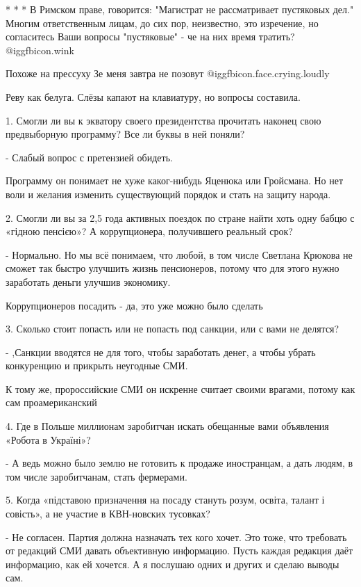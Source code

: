 \begin{itemize}
* * *
В Римском праве, говорится:
"Магистрат не рассматривает пустяковых дел."
Многим ответственным лицам, до сих пор, неизвестно, это изречение, но согласитесь Ваши вопросы "пустяковые" - че на них время тратить? @igg{fbicon.wink} 


Похоже на прессуху Зе меня завтра не позовут  @igg{fbicon.face.crying.loudly} 

Реву как белуга. Слёзы капают на клавиатуру, но вопросы составила.

1. Смогли ли вы к экватору своего президентства прочитать наконец свою
предвыборную программу? Все ли буквы в ней поняли?

- Слабый вопрос с претензией обидеть.

Программу он понимает не хуже каког-нибудь Яценюка или Гройсмана. Но нет воли и
желания изменить существующий порядок и стать на защиту народа.

2. Смогли ли вы за 2,5 года активных поездок по стране найти хоть одну бабцю с
«гідною пенсією»? А коррупционера, получившего реальный срок?

- Нормально. Но мы всё понимаем, что любой, в том числе Светлана Крюкова не
сможет так быстро улучшить жизнь пенсионеров, потому что для этого нужно
заработать деньги улучшив экономику.

Коррупционеров посадить - да, это уже можно было сделать

3. Сколько стоит попасть или не попасть под санкции, или с вами не делятся?

- ,Санкции вводятся не для того, чтобы заработать денег, а чтобы убрать
конкуренцию и прикрыть неугодные СМИ.

К тому же, пророссийские СМИ он искренне считает своими врагами, потому как сам
проамериканский

4. Где в Польше миллионам заробитчан искать обещанные вами объявления «Робота в
Україні»?

- А ведь можно было землю не готовить к продаже иностранцам, а дать людям, в
том числе заробитчанам, стать фермерами.

5. Когда «підставою призначення на посаду стануть розум, освіта, талант і
совість», а не участие в КВН-новских тусовках?

- Не согласен. Партия должна назначать тех кого хочет. Это тоже, что требовать
от редакций СМИ давать объективную информацию. Пусть каждая редакция даёт
информацию, как ей хочется. А я послушаю одних и других и сделаю выводы сам.


\end{itemize}
